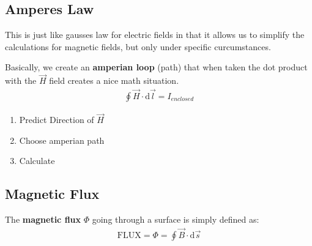\documentclass[12pt,letterpaper]{article} \usepackage{amsmath} \usepackage{graphicx} \usepackage[margin=1in]{geometry} \usepackage{longtable}  \usepackage{amssymb}
\begin{document}
	\subsection{Amperes Law}
	This is just like gausses law for electric fields in that it allows us to simplify the calculations for magnetic fields, but only under specific curcumstances. 
	
	Basically, we create an \textbf{amperian loop} (path) that when taken the dot product with the $\vec H$ field creates a nice math situation.
	\begin{align*}
		\oint \vec H \cdot \mathrm d \vec l = I_{enclosed}
	\end{align*}
	\begin{enumerate}[noitemsep]
		\item Predict Direction of $\vec H$
		\item Choose amperian path
		\item Calculate
	\end{enumerate}

	\subsection{Magnetic Flux}
	The \textbf{magnetic flux} $\Phi$ going through a surface is simply defined as:
	\begin{align*}
		\text{FLUX} = \Phi = \oint \vec B \cdot \mathrm d \vec s
	\end{align*}
	
\end{document}
